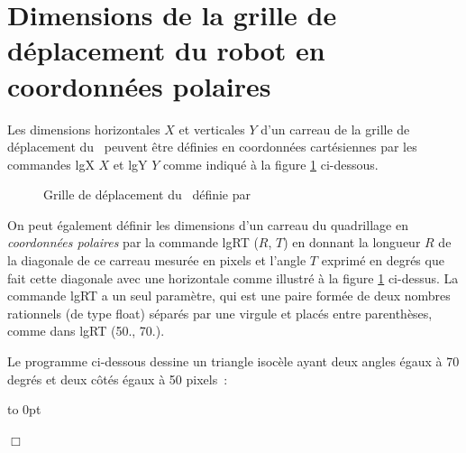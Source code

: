 \section{Dimensions de la grille de déplacement du robot en coordonnées polaires}
Les dimensions horizontales $X$ et verticales $Y$ d'un carreau de la grille de dé\-pla\-ce\-ment du
\robot\ peuvent être définies en coordonnées cartésiennes par les commandes
{\idt lgX} $X$ et {\idt lgY} $Y$ comme indiqué à la figure \ref{fig:lgrt} ci-dessous.

\begin{figure}[h]
 \parbox{13.7cm}{\caption{Grille de déplacement du \protect\robot\ définie par}\label{fig:lgrt}} 
\end{figure}

On peut également définir les dimensions d'un carreau du quadrillage en {\em coordonnées
polaires} par la commande
{\idt lgRT (}$R${\idt ,} $T${\idt )} en donnant la longueur $R$ de la diagonale de ce carreau mesurée
en pixels et
l'angle $T$  exprimé en degrés que fait cette diagonale avec une horizontale
comme illustré à la figure \ref{fig:lgrt} ci-dessus. La commande {\idt lgRT} a un seul
paramètre, qui est une paire formée de deux nombres rationnels (de type {\idt float}) séparés par une virgule et
placés entre parenthèses, comme dans {\idt lgRT (50., 70.)}.

\begin{exemple}{\rm
Le programme ci-dessous dessine un triangle isocèle ayant deux angles égaux
à 70 degrés et deux côtés égaux à 50 pixels~:

{\raggedright 
 \vbox to 0pt{}%
 
 }
\noindent $\Box$ }
\end{exemple}

